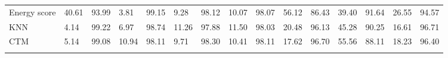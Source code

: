 \documentclass[nohyperref]{article}
\theoremstyle{plain}
\theoremstyle{definition}
\theoremstyle{remark}
\newcommand{\shortname}{CTM}
\begin{document}
\begin{table}
{\begin{tabular}{lllllllllllllll}
Energy score & 40.61 & 93.99 & 3.81 & 99.15 & 9.28 & 98.12 & 10.07 & 98.07 & 56.12 & 86.43 & 39.40 & 91.64 & 26.55 & 94.57 \\ 
KNN & 4.14 & 99.22 & 6.97 & 98.74 & 11.26 & 97.88 & 11.50 & 98.03 & 20.48 & 96.13 & 45.28 & 90.25 & 16.61 & 96.71 \\
\shortname & 5.14 & 99.08 & 10.94 & 98.11 & 9.71 & 98.30 & 10.41 & 98.11 & 17.62 & 96.70 & 55.56 & 88.11 & 18.23 & 96.40 \\ 
\\ \bottomrule
\end{tabular}}
\label{tab:detailresultscifar10}
\end{table}

\begin{table}
\caption{\small Detailed results on six common OOD benchmark datasets: \texttt{Textures}~\cite{cimpoi2014describing}, \texttt{SVHN}~\cite{netzer2011reading}, \texttt{Places365}~\cite{zhou2017places}, \texttt{LSUN-Crop}~\cite{yu2015lsun}, \texttt{LSUN-Resize}~\cite{yu2015lsun}, and \texttt{iSUN}~\cite{xu2015turkergaze}. For each ID dataset, we use the same DenseNet pretrained on \textbf{CIFAR-100}. $\uparrow$ indicates larger values are better and $\downarrow$ indicates smaller values are better. }
\end{table}
\end{document}
